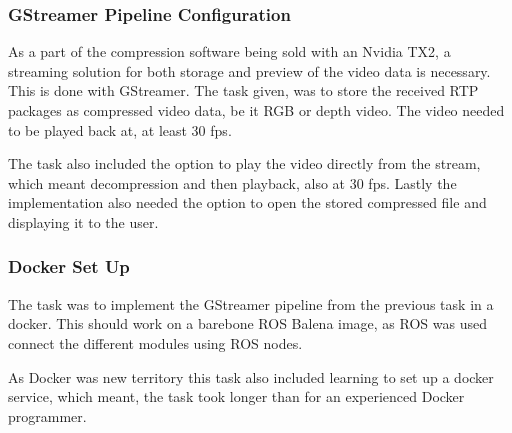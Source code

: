 \subsubsection{GStreamer Pipeline Configuration}
As a part of the compression software being sold with an Nvidia TX2, a streaming solution for both storage and preview of the video data is necessary. This is done with GStreamer. The task given, was to store the received RTP packages as compressed video data, be it RGB or depth video. The video needed to be played back at, at least 30 \gls{fps}.

The task also included the option to play the video directly from the stream, which meant decompression and then playback, also at 30 \gls{fps}. Lastly the implementation also needed the option to open the stored compressed file and displaying it to the user.

\subsubsection{Docker Set Up}
The task was to implement the GStreamer pipeline from the previous task in a docker. This should work on a barebone ROS Balena image, as ROS was used connect the different modules using ROS nodes. 

As Docker was new territory this task also included learning to set up a docker service, which meant, the task took longer than for an experienced Docker programmer.